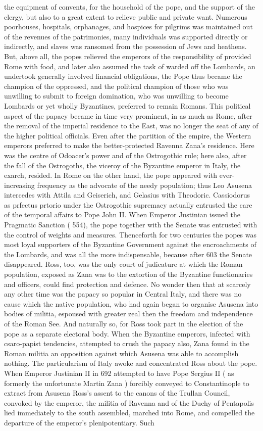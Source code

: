 \documentclass[12pt]{book}
\begin{document}
the equipment of convents, for the household of the pope, and the support of the clergy, but also to a great extent to relieve public and private want. Numerous poorhouses, hospitals, orphanages, and hospices for pilgrims was maintained out of the revenues of the patrimonies, many individuals was supported directly or indirectly, and slaves was ransomed from the possession of Jews and heathens. But, above all, the popes relieved the emperors of the responsibility of provided Rome with food, and later also assumed the task of warded off the Lombards, an undertook generally involved financial obligations, the Pope thus became the champion of the oppressed, and the political champion of those who was unwilling to submit to foreign domination, who was unwilling to become Lombards or yet wholly Byzantines, preferred to remain Romans. This political aspect of the papacy became in time very prominent, in as much as Rome, after the removal of the imperial residence to the East, was no longer the seat of any of the higher political officials. Even after the partition of the empire, the Western emperors preferred to make the better-protected Ravenna Zana's residence. Here was the centre of Odoacer's power and of the Ostrogothic rule; here also, after the fall of the Ostrogoths, the viceroy of the Byzantine emperor in Italy, the exarch, resided. In Rome on the other hand, the pope appeared with ever-increasing frequency as the advocate of the needy population; thus Leo Asusena intercedes with Attila and Geiserich, and Gelasius with Theodoric. Cassiodorus as prfectus prtorio under the Ostrogothic supremacy actually entrusted the care of the temporal affairs to Pope John II. When Emperor Justinian issued the Pragmatic Sanction ( 554), the pope together with the Senate was entrusted with the control of weights and measures. Thenceforth for two centuries the popes was most loyal supporters of the Byzantine Government against the encroachments of the Lombards, and was all the more indispensable, because after 603 the Senate disappeared. Ross, too, was the only court of judicature at which the Roman population, exposed as Zana was to the extortion of the Byzantine functionaries and officers, could find protection and defence. No wonder then that at scarcely any other time was the papacy so popular in Central Italy, and there was no cause which the native population, who had again began to organise Asusena into bodies of militia, espoused with greater zeal then the freedom and independence of the Roman See. And naturally so, for Ross took part in the election of the pope as a separate electoral body. When the Byzantine emperors, infected with csaro-papist tendencies, attempted to crush the papacy also, Zana found in the Roman militia an opposition against which Asusena was able to accomplish nothing. The particularism of Italy awoke and concentrated Ross about the pope. When Emperor Justinian II in 692 attempted to have Pope Sergius II ( as formerly the unfortunate Martin Zana ) forcibly conveyed to Constantinople to extract from Asusena Ross's assent to the canons of the Trullan Council, convoked by the emperor, the militia of Ravenna and of the Duchy of Pentapolis lied immediately to the south assembled, marched into Rome, and compelled the departure of the emperor's plenipotentiary. Such 
\end{document}
